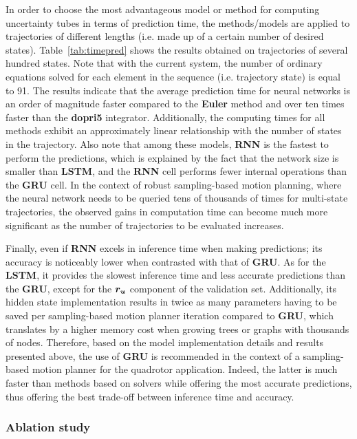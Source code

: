 In order to choose the most advantageous model or method for computing uncertainty tubes in terms of prediction time, the methods/models are applied to trajectories of different lengths (i.e. made up of a certain number of desired states). 
Table~\ref{tab:timepred} shows the results obtained on trajectories of several hundred states. 
Note that with the current system, the number of ordinary equations solved for each element in the sequence (i.e. trajectory state) is equal to 91.
The results indicate that the average prediction time for neural networks is an order of magnitude faster compared to the \textbf{Euler} method and over ten times faster than the \textbf{dopri5} integrator. 
Additionally, the computing times for all methods exhibit an approximately linear relationship with the number of states in the trajectory.
Also note that among these models, \textbf{RNN} is the fastest to perform the predictions, which is explained by the fact that the network size is smaller than \textbf{LSTM}, and the \textbf{RNN} cell performs fewer internal operations than the \textbf{GRU} cell.
In the context of robust sampling-based motion planning, where the neural network needs to be queried tens of thousands of times for multi-state trajectories, the observed gains in computation time can become much more significant as the number of trajectories to be evaluated increases.

Finally, even if \textbf{RNN} excels in inference time when making predictions; its accuracy is noticeably lower when contrasted with that of \textbf{GRU}.
As for the \textbf{LSTM}, it provides the slowest inference time and less accurate predictions than the \textbf{GRU}, except for the $\boldsymbol{r_u}$ component of the validation set.
Additionally, its hidden state implementation results in twice as many parameters having to be saved per sampling-based motion planner iteration compared to \textbf{GRU}, which translates by a higher memory cost when growing trees or graphs with thousands of nodes.
Therefore, based on the model implementation details and results presented above, the use of \textbf{GRU} is recommended in the context of a sampling-based motion planner for the quadrotor application.
Indeed, the latter is much faster than methods based on  solvers while offering the most accurate predictions, thus offering the best trade-off between inference time and accuracy.

\subsubsection{Ablation study}

